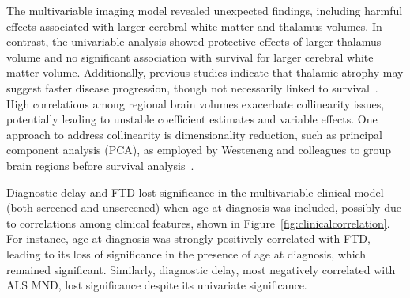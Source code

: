 The multivariable imaging model revealed unexpected findings, including harmful effects associated with larger cerebral white matter and thalamus volumes.
In contrast, the univariable analysis showed protective effects of larger thalamus volume and no significant association with survival for larger cerebral white matter volume.
Additionally, previous studies indicate that thalamic atrophy may suggest faster disease progression, though not necessarily linked to survival~\cite{sendaStructuralMRICorrelates2017,dieckmannCorticalSubcorticalGrey2022}.
High correlations among regional brain volumes exacerbate collinearity issues, potentially leading to unstable coefficient estimates and variable effects.
One approach to address collinearity is dimensionality reduction, such as principal component analysis (PCA), as employed by Westeneng and colleagues to group brain regions before survival analysis~\cite{westenengSubcorticalStructuresAmyotrophic2015}.
%
%

Diagnostic delay and FTD lost significance in the multivariable clinical model (both screened and unscreened) when age at diagnosis was included, possibly due to correlations among clinical features, shown in Figure~\ref{fig:clinicalcorrelation}.
For instance, age at diagnosis was strongly positively correlated with FTD, leading to its loss of significance in the presence of age at diagnosis, which remained significant.
Similarly, diagnostic delay, most negatively correlated with ALS MND, lost significance despite its univariate significance.


